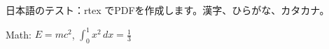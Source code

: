 \documentclass{article}
\begin{document}
日本語のテスト：rtex でPDFを作成します。漢字、ひらがな、カタカナ。

Math: $E = mc^2$, $\int_0^1 x^2\,dx = \frac{1}{3}$
\end{document}
